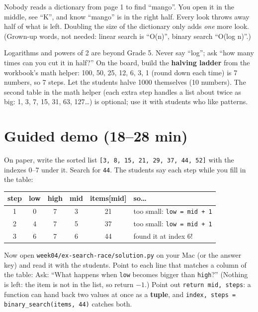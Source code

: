 \begin{analogy}
Nobody reads a dictionary from page 1 to find \enquote{mango}. You open it in the middle, see \enquote{K}, and know \enquote{mango} is in the right half. Every look throws away half of what is left. Doubling the size of the dictionary only adds \emph{one} more look. (Grown-up words, not needed: linear search is \enquote{O(n)}, binary search \enquote{O(log n)}.)
\end{analogy}

\begin{teachernote}
Logarithms and powers of 2 are beyond Grade 5. Never say \enquote{log}; ask \enquote{how many times can you cut it in half?} On the board, build the \textbf{halving ladder} from the workbook's math helper: 100, 50, 25, 12, 6, 3, 1 (round down each time) is 7 numbers, so 7 steps. Let the students halve 1000 themselves (10 numbers). The second table in the math helper (each extra step handles a list about twice as big: 1, 3, 7, 15, 31, 63, 127\ldots) is optional; use it with students who like patterns.
\end{teachernote}


\section{Guided demo (18--28 min)}
\begin{workedexample}
On paper, write the sorted list \texttt{[3, 8, 15, 21, 29, 37, 44, 52]} with the indexes 0--7 under it. Search for \texttt{44}. The students say each step while you fill in the table:
\begin{center}
\begin{tabular}{@{}cccccl@{}}
\toprule
\textbf{step} & \textbf{low} & \textbf{high} & \textbf{mid} & \textbf{items[mid]} & \textbf{so\ldots} \\ \midrule
1 & 0 & 7 & 3 & 21 & too small: \texttt{low = mid + 1} \\
2 & 4 & 7 & 5 & 37 & too small: \texttt{low = mid + 1} \\
3 & 6 & 7 & 6 & 44 & found it at index 6! \\
\bottomrule
\end{tabular}
\end{center}
Now open \texttt{week04/ex-search-race/solution.py} on your Mac (or the answer key) and read it with the students. Point to each line that matches a column of the table:
Ask: \enquote{What happens when \texttt{low} becomes bigger than \texttt{high}?} (Nothing is left: the item is not in the list, so return $-1$.) Point out \texttt{return mid, steps}: a function can hand back two values at once as a \textbf{tuple}, and \texttt{index, steps = binary\_search(items, 44)} catches both.
\end{workedexample}

